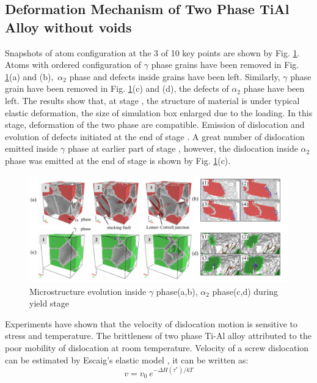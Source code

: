 \documentclass[Unknown,article,submit,moreauthors,pdftex,10pt,a4paper]{Definitions/mdpi}
\begin{document}
\subsection{Deformation Mechanism of Two Phase TiAl Alloy without voids}
Snapshots of atom configuration at the 3 of 10 key points are shown by Fig. \ref{fig:Defect}.  Atoms with ordered configuration  of $\gamma$ phase grains have been removed in Fig. \ref{fig:Defect}(a) and (b),\ $\alpha_2$ phase and defects inside grains have been left. Similarly, $\gamma$ phase grain have been removed in Fig. \ref{fig:Defect}(c) and (d), the defects of $\alpha_2$ phase have been left.  The results show that, at stage \uppercase\expandafter{}, the structure of material is under typical elastic deformation, the size of simulation box enlarged due to the loading. In this stage, deformation of the two phase are compatible. Emission of dislocation and evolution of defects initiated at the end of stage \uppercase\expandafter{}. A  great number of dislocation emitted inside $\gamma$ phase at earlier part of stage \uppercase\expandafter{}, however, the dislocation inside $\alpha_2$ phase was emitted at the end of stage \uppercase\expandafter{} is shown by Fig. \ref{fig:Defect}(c).  
\begin{figure}[ht] 
	\centering
	\includegraphics[width=1\linewidth]{img/def-box}
	\caption{Microstructure evolution inside $\gamma$ phase(a,b), $\alpha_2$ phase(c,d) during yield stage}
	\label{fig:Defect}
\end{figure}
Experiments have shown that the velocity of dislocation motion is sensitive to stress and temperature\cite{Stein1960}. The brittleness of two phase Ti-Al alloy attributed to the poor mobility of dislocation at room temperature. Velocity of a screw dislocation can be estimated by Escaig's elastic model \cite{Escaig1968}, it can be written as:
\begin{equation}\label{eq:temp-dis}
v = v_0\ e^{-\Delta H(\tau^*)/kT}
\end{equation}
\end{document}

